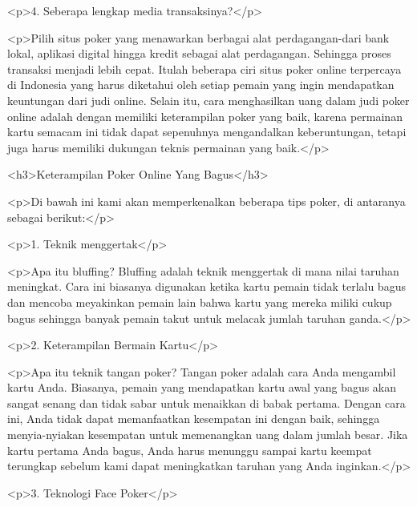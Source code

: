 {<p>4. Seberapa lengkap media transaksinya?</p>



<p>Pilih situs poker yang menawarkan berbagai alat perdagangan-dari bank lokal, aplikasi digital hingga kredit sebagai alat perdagangan. Sehingga proses transaksi menjadi lebih cepat. Itulah beberapa ciri situs poker online terpercaya di Indonesia yang harus diketahui oleh setiap pemain yang ingin mendapatkan keuntungan dari judi online. Selain itu, cara menghasilkan uang dalam judi poker online adalah dengan memiliki keterampilan poker yang baik, karena permainan kartu semacam ini tidak dapat sepenuhnya mengandalkan keberuntungan, tetapi juga harus memiliki dukungan teknis permainan yang baik.</p>



<h3>Keterampilan Poker Online Yang Bagus</h3>



<p>Di bawah ini kami akan memperkenalkan beberapa tips poker, di antaranya sebagai berikut:</p>



<p>1. Teknik menggertak</p>



<p>Apa itu bluffing? Bluffing adalah teknik menggertak di mana nilai taruhan meningkat. Cara ini biasanya digunakan ketika kartu pemain tidak terlalu bagus dan mencoba meyakinkan pemain lain bahwa kartu yang mereka miliki cukup bagus sehingga banyak pemain takut untuk melacak jumlah taruhan ganda.</p>



<p>2. Keterampilan Bermain Kartu</p>



<p>Apa itu teknik tangan poker? Tangan poker adalah cara Anda mengambil kartu Anda. Biasanya, pemain yang mendapatkan kartu awal yang bagus akan sangat senang dan tidak sabar untuk menaikkan di babak pertama. Dengan cara ini, Anda tidak dapat memanfaatkan kesempatan ini dengan baik, sehingga menyia-nyiakan kesempatan untuk memenangkan uang dalam jumlah besar. Jika kartu pertama Anda bagus, Anda harus menunggu sampai kartu keempat terungkap sebelum kami dapat meningkatkan taruhan yang Anda inginkan.</p>



<p>3. Teknologi Face Poker</p>



}
